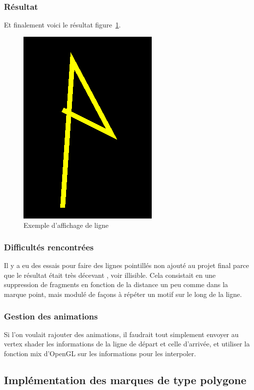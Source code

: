 \documentclass[12pt]{article}
\begin{document}
\subsubsection{Résultat}
Et finalement voici le résultat figure~\ref{fig:line}.
\begin{figure}[htp]
  \centering
  \includegraphics[scale=0.8]{images/line_example}
  \caption{Exemple d'affichage de ligne}
  \label{fig:line}
\end{figure}

\subsubsection{Difficultés rencontrées}
Il y a eu des essais pour faire des lignes pointillés non ajouté au projet final parce que le résultat était très décevant , 
voir illisible. Cela consistait en une suppression de fragments en fonction de la distance un peu comme dans la marque point, 
mais modulé de façons à répéter un motif sur le long de la ligne.

\subsubsection{Gestion des animations}
Si l'on voulait rajouter des animations, il faudrait tout simplement envoyer au vertex shader
les informations de la ligne de départ et celle d'arrivée, et utiliser la fonction mix d'OpenGL
sur les informations pour les interpoler.

\subsection{Implémentation des marques de type polygone}
\end{document}
